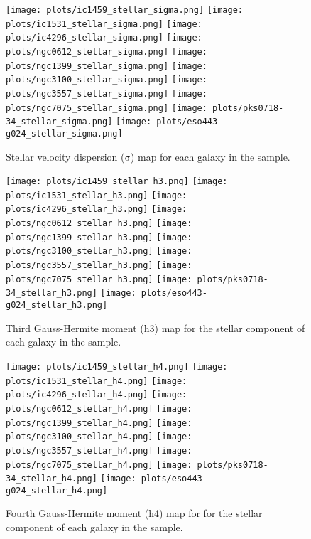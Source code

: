 \documentclass[fleqn,usenatbib,useAMS]{mnras}
\begin{document}
		\begin{figure*}
			\centering
			\texttt{[image: plots/ic1459\_stellar\_sigma.png]}
			\texttt{[image: plots/ic1531\_stellar\_sigma.png]}
			\texttt{[image: plots/ic4296\_stellar\_sigma.png]}
			\texttt{[image: plots/ngc0612\_stellar\_sigma.png]}
			\texttt{[image: plots/ngc1399\_stellar\_sigma.png]}
			\texttt{[image: plots/ngc3100\_stellar\_sigma.png]}
			\texttt{[image: plots/ngc3557\_stellar\_sigma.png]}
			\texttt{[image: plots/ngc7075\_stellar\_sigma.png]}
			\texttt{[image: plots/pks0718-34\_stellar\_sigma.png]}
			\texttt{[image: plots/eso443-g024\_stellar\_sigma.png]}
			\caption{Stellar velocity dispersion ($\mathrm{\sigma}$) map for each galaxy in the sample.}
			\label{fig:stellar_sigma}
		\end{figure*}


		\begin{figure*}
			\centering
			\texttt{[image: plots/ic1459\_stellar\_h3.png]}
			\texttt{[image: plots/ic1531\_stellar\_h3.png]}
			\texttt{[image: plots/ic4296\_stellar\_h3.png]}
			\texttt{[image: plots/ngc0612\_stellar\_h3.png]}
			\texttt{[image: plots/ngc1399\_stellar\_h3.png]}
			\texttt{[image: plots/ngc3100\_stellar\_h3.png]}
			\texttt{[image: plots/ngc3557\_stellar\_h3.png]}
			\texttt{[image: plots/ngc7075\_stellar\_h3.png]}
			\texttt{[image: plots/pks0718-34\_stellar\_h3.png]}
			\texttt{[image: plots/eso443-g024\_stellar\_h3.png]}
			\caption{Third Gauss-Hermite moment (h3) map for the stellar component of each galaxy in the sample.}
			\label{fig:stellar_h3}
		\end{figure*}

		\begin{figure*}
			\centering
			\texttt{[image: plots/ic1459\_stellar\_h4.png]}
			\texttt{[image: plots/ic1531\_stellar\_h4.png]}
			\texttt{[image: plots/ic4296\_stellar\_h4.png]}
			\texttt{[image: plots/ngc0612\_stellar\_h4.png]}
			\texttt{[image: plots/ngc1399\_stellar\_h4.png]}
			\texttt{[image: plots/ngc3100\_stellar\_h4.png]}
			\texttt{[image: plots/ngc3557\_stellar\_h4.png]}
			\texttt{[image: plots/ngc7075\_stellar\_h4.png]}
			\texttt{[image: plots/pks0718-34\_stellar\_h4.png]}
			\texttt{[image: plots/eso443-g024\_stellar\_h4.png]}
			\caption{Fourth Gauss-Hermite moment (h4) map for for the stellar component of each galaxy in the sample.}
			\label{fig:stellar_h4}
		\end{figure*}
\end{document}
